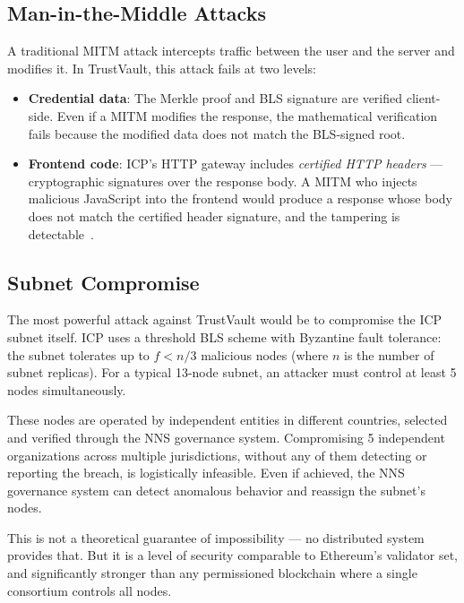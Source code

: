 \documentclass[journal]{IEEEtran}
\begin{document}
\subsection{Man-in-the-Middle Attacks}

A traditional MITM attack intercepts traffic between the user and the server and modifies it. In TrustVault, this attack fails at two levels:

\begin{itemize}[leftmargin=*]
  \item \textbf{Credential data}: The Merkle proof and BLS signature are verified client-side. Even if a MITM modifies the response, the mathematical verification fails because the modified data does not match the BLS-signed root.
  \item \textbf{Frontend code}: ICP's HTTP gateway includes \emph{certified HTTP headers} — cryptographic signatures over the response body. A MITM who injects malicious JavaScript into the frontend would produce a response whose body does not match the certified header signature, and the tampering is detectable~\cite{dfinity2023httpgateway}.
\end{itemize}

\subsection{Subnet Compromise}

The most powerful attack against TrustVault would be to compromise the ICP subnet itself. ICP uses a threshold BLS scheme with Byzantine fault tolerance: the subnet tolerates up to $f < n/3$ malicious nodes (where $n$ is the number of subnet replicas). For a typical 13-node subnet, an attacker must control at least 5 nodes simultaneously.

These nodes are operated by independent entities in different countries, selected and verified through the NNS governance system. Compromising 5 independent organizations across multiple jurisdictions, without any of them detecting or reporting the breach, is logistically infeasible. Even if achieved, the NNS governance system can detect anomalous behavior and reassign the subnet's nodes.

This is not a theoretical guarantee of impossibility — no distributed system provides that. But it is a level of security comparable to Ethereum's validator set, and significantly stronger than any permissioned blockchain where a single consortium controls all nodes.
\end{document}
